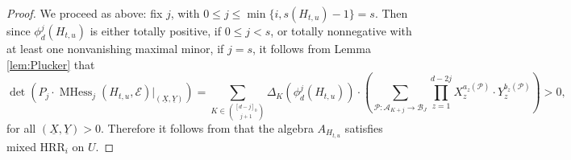 \documentclass[unnumsec,webpdf,modern,medium]{oup-authoring-template}
\theoremstyle{theorem}
\theoremstyle{definition}
\begin{document}
\begin{proof}
	
	
	We proceed as above:  fix $j$, with $0\leq j\leq \min\{i,s(H_{t,u})-1\}=s$.  Then since $\phi^j_d(H_{t,u})$ is either totally positive, if $0\leq j<s$, or totally nonnegative with at least one nonvanishing maximal minor, if $j=s$, it follows from Lemma \ref{lem:Plucker} that
	$$\det\left(P_j\cdot\operatorname{MHess}_j(H_{t,u},\mathcal{E})|_{(\underline{X},\underline{Y})}\right)=\sum_{K\in\binom{[d-j]_0}{j+1}}\Delta_K(\phi^j_d(H_{t,u}))\cdot\left(\sum_{\mathcal{P}\colon \mathcal{A}_{K+j}\rightarrow\mathcal{B}_J}\prod_{z=1}^{d-2j}X_z^{a_z(\mathcal{P})}\cdot Y_z^{b_z(\mathcal{P})}\right)>0,$$
	for all $(\underline{X},\underline{Y})>0$.  Therefore it follows from \cite[Lemma 3.13]{MMS} that the algebra $A_{H_{t,u}}$ satisfies mixed HRR$_i$ on $U$.  

\end{proof}
\end{document}
